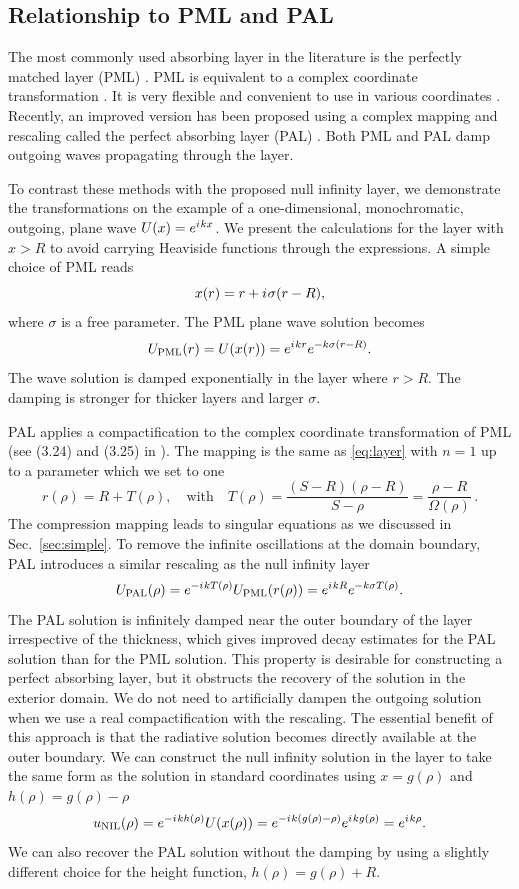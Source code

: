 \documentclass[draft,onefignum,onetabnum]{siamart190516}
\newcommand{\be}{\begin{equation}}
\newcommand{\ee}{\end{equation}}
\newcommand{\iu}{{i\mkern1mu}}
\begin{document}
\subsection{Relationship to PML and PAL}
The most commonly used absorbing layer in the literature is the perfectly matched layer (PML) \cite{BERENGER1994185}. PML is equivalent to a complex coordinate transformation \cite{chew19943d}. It is very flexible and convenient to use in various coordinates \cite{collino1998perfectly}. Recently, an improved version has been proposed using a complex mapping and rescaling called the perfect absorbing layer (PAL) \cite{wang2017perfect, yang2021truly}. Both PML and PAL damp outgoing waves propagating through the layer.

To contrast these methods with the proposed null infinity layer, we demonstrate the transformations on the example of a one-dimensional, monochromatic, outgoing, plane wave $U(x)=e^{\iu kx}$. We present the calculations for the layer with $x>R$ to avoid carrying Heaviside functions through the expressions. A simple choice of PML reads 
\be\label{eq:pml} x(r) = r + \iu \sigma (r-R), \ee
where $\sigma$ is a free parameter. The PML plane wave solution becomes
\[ U_{\mathrm{PML}}(r) = U(x(r)) = e^{\iu k r} e^{- k \sigma (r-R)}. \]
The wave solution is damped exponentially in the layer where $r>R$. The damping is stronger for thicker layers and larger $\sigma$.

PAL applies a compactification to the complex coordinate transformation of PML (see (3.24) and (3.25) in \cite{yang2021truly}). The mapping is the same as \eqref{eq:layer} with $n=1$ up to a parameter which we set to one 
\[ r(\rho) = R + T(\rho), \quad \mathrm{with} \quad T(\rho) = \frac{(S-R)(\rho-R)}{S-\rho} = \frac{\rho-R}{\Omega(\rho)}\,. \]
The compression mapping leads to singular equations as we discussed in Sec.~\ref{sec:simple}. To remove the infinite oscillations at the domain boundary, PAL introduces a similar rescaling as the null infinity layer
\[ U_{\mathrm{PAL}}(\rho) = e^{-\iu k T(\rho)} U_{\mathrm{PML}}(r(\rho)) = e^{\iu k R} e^{-k \sigma T(\rho)}. \]
The PAL solution is infinitely damped near the outer boundary of the layer irrespective of the thickness, which gives improved decay estimates for the PAL solution than for the PML solution. This property is desirable for constructing a perfect absorbing layer, but it obstructs the recovery of the solution in the exterior domain. We do not need to artificially dampen the outgoing solution when we use a real compactification with the rescaling. The essential benefit of this approach is that the radiative solution becomes directly available at the outer boundary. We can construct the null infinity solution in the layer to take the same form as the solution in standard coordinates using $x=g(\rho)$ and $h(\rho) = g(\rho) - \rho$
\[ u_{\mathrm{NIL}}(\rho) = e^{-\iu k h(\rho)} U(x(\rho)) = e^{-\iu k (g(\rho)-\rho)} e^{\iu k g(\rho)} = e^{\iu k \rho}. \]
We can also recover the PAL solution without the damping by using a slightly different choice for the height function,  $h(\rho) = g(\rho) + R$.  
\end{document}
